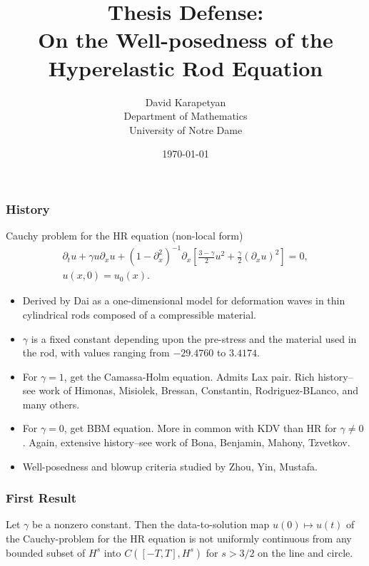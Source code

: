 \documentclass{beamer}
\date{\today}
\title[WP for the HR Equation]{Thesis Defense: \\On the Well-posedness of the \\ Hyperelastic Rod Equation}
\author[David Karapetyan]{David Karapetyan \\
Department of Mathematics \\
University of Notre Dame}
\institute[Notre Dame]{}
\newcommand{\p}{\partial}
\begin{document}
 \begin{frame}
	 \titlepage
 \end{frame}


 \begin{frame}
	 \frametitle{History}
	 Cauchy problem for the HR equation (non-local form)
	 \begin{gather*} 
	   \partial_t u + \gamma u\partial_x u + (1-\p_x^2)^{-1} \p_x \left
	   [\frac{3- \gamma}{2} u^2 + \frac{\gamma}{2}(\p_x u)^2 \right ] = 0,
	   \\
	   u(x, 0) = u_0(x).
	 \end{gather*}
%
%
%
\pause
%
\begin{itemize}
  \item{Derived by Dai as a one-dimensional 
model for deformation waves in thin cylindrical
rods composed of a compressible material}.
\pause
\item{$\gamma$ is a fixed constant depending upon 
the pre-stress and the material used in
the rod, with values ranging from $- 29.4760$ to $3.4174$}.
\pause
\item{For $\gamma = 1$, get the Camassa-Holm equation. Admits Lax pair. Rich history--see work of Himonas, Misiolek, Bressan, Constantin, Rodriguez-BLanco, and many others}.
\pause
\item{For $\gamma =0$, get BBM equation. More in common with KDV than HR for $\gamma \neq 0$. Again, extensive history--see work of Bona, Benjamin, Mahony, Tzvetkov}.
\pause
\item{Well-posedness and blowup criteria studied by Zhou, Yin, Mustafa.}
\end{itemize}

\end{frame}
%
\begin{frame}
  \frametitle{First Result}
%
\begin{theorem}
\label{hr-non-unif-dependence}
Let $\gamma$ be a nonzero constant. Then 
the data-to-solution map $u(0) \mapsto u(t)$ of the Cauchy-problem
for the HR equation is not uniformly continuous
from any bounded subset of  $H^s$ into $C([-T, T], H^s)$
for $s>3/2$ on the line and circle.
%
\end{theorem}
\end{frame}
\end{document}
